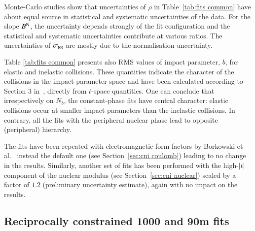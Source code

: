 Monte-Carlo studies show that uncertainties of $\rho$ in Table~\ref{tab:fits common} have about equal source in statistical and systematic uncertainties of the data. For the slope $B^{\rm N}$, the uncertainty depends strongly of the fit configuration and the statistical and systematic uncertainties contribute at various ratios. The uncertainties of $\sigma_{\rm tot}$ are mostly due to the normalisation uncertainty.

Table \ref{tab:fits common} presents also RMS values of impact parameter, $b$, for elastic and inelastic collisions. These quantities indicate the character of the collisions in the impact parameter space and have been calculated according to Section 3 in~\cite{klk02}, directly from $t$-space quantities. 
One can conclude that irrespectively on $N_b$, the constant-phase fits have central character: elastic collisions occur at smaller impact parameters than the inelastic collisions. In contrary, all the fits with the peripheral nuclear phase lead to opposite (peripheral) hierarchy.

The fits have been repeated with electromagnetic form factors by Borkowski et al.~\cite{borkowski} instead the default one (see Section~\ref{sec:cni coulomb}) leading to no change in the results. Similarly, another set of fits has been performed with the high-$|t|$ component of the nuclear modulus (see Section~\ref{sec:cni nuclear}) scaled by a factor of $1.2$ (preliminary uncertainty estimate), again with no impact on the results.



\subsection{Reciprocally constrained 1000 and 90m fits}
\label{sec:cni reciprocal fits}

